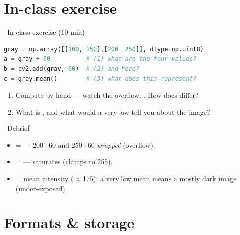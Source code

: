 \documentclass[10pt,aspectratio=169]{beamer}
\begin{document}
\section{In-class exercise}

\begin{frame}[fragile]{\faPen~In-class exercise (10 min)}
  \begin{infobox}
  \end{infobox}
\begin{lstlisting}[language=Python]
gray = np.array([[100, 150],[200, 250]], dtype=np.uint8)
a = gray + 60          # (1) what are the four values?
b = cv2.add(gray, 60)  # (2) and here?
c = gray.mean()        # (3) what does this represent?
\end{lstlisting}
  \begin{enumerate}
    \item Compute  by hand — watch the overflow. . How does  differ?
    \item What is , and what would a very low  tell you about the image?
  \end{enumerate}
\end{frame}

\begin{frame}{\faPen~Debrief}
  \begin{itemize}
    \item {} = \code{[[160,210],[4,54]]} — 200+60 and 250+60 \emph{wrapped} (overflow).
    \item {} = \code{[[160,210],[255,255]]} —  saturates (clamps to 255).
    \item {} = mean intensity ($\approx$175); a very low mean means a mostly dark image (under-exposed).
  \end{itemize}
\end{frame}

\section{Formats \& storage}
\end{document}
